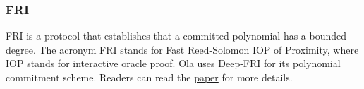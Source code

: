\subsubsection{FRI}\label{section: starky-fri}

FRI is a protocol that establishes that a committed polynomial has a bounded degree. The acronym FRI stands for Fast Reed-Solomon IOP of Proximity, where IOP stands for interactive oracle proof. Ola uses Deep-FRI for its polynomial commitment scheme. Readers can read the \href{https://arxiv.org/abs/1903.12243}{paper} for more details.